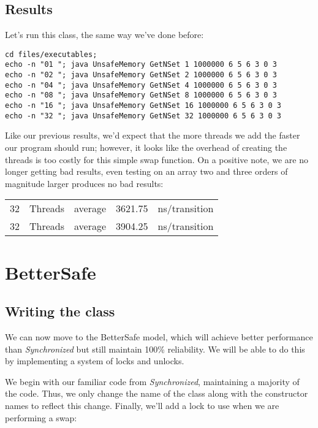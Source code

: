 \documentclass[11pt]{article}
\begin{document}
\subsection{Results}
\label{sec-4-2}
Let's run this class, the same way we've done before:

\begin{verbatim}
cd files/executables;
echo -n "01 "; java UnsafeMemory GetNSet 1 1000000 6 5 6 3 0 3
echo -n "02 "; java UnsafeMemory GetNSet 2 1000000 6 5 6 3 0 3
echo -n "04 "; java UnsafeMemory GetNSet 4 1000000 6 5 6 3 0 3
echo -n "08 "; java UnsafeMemory GetNSet 8 1000000 6 5 6 3 0 3
echo -n "16 "; java UnsafeMemory GetNSet 16 1000000 6 5 6 3 0 3
echo -n "32 "; java UnsafeMemory GetNSet 32 1000000 6 5 6 3 0 3
\end{verbatim}

Like our previous results, we'd expect that the more threads we add
the faster our program should run; however, it looks like the overhead
of creating the threads is too costly for this simple swap function.
On a positive note, we are no longer getting bad results, even testing
on an array two and three orders of magnitude larger produces no
bad results:

\begin{center}
\begin{tabular}{rllrl}
32 & Threads & average & 3621.75 & ns/transition\\
32 & Threads & average & 3904.25 & ns/transition\\
\end{tabular}
\end{center}

\section{BetterSafe}
\label{sec-5}
\subsection{Writing the class}
\label{sec-5-1}
We can now move to the BetterSafe model, which will
achieve better performance than \emph{Synchronized} but
still maintain 100\% reliability. We will be able to
do this by implementing a system of locks and unlocks.

We begin with our familiar code from \emph{Synchronized},
maintaining a majority of the code. Thus, we only
change the name of the class along with the constructor
names to reflect this change. Finally, we'll add a
lock to use when we are performing a swap:
\end{document}
